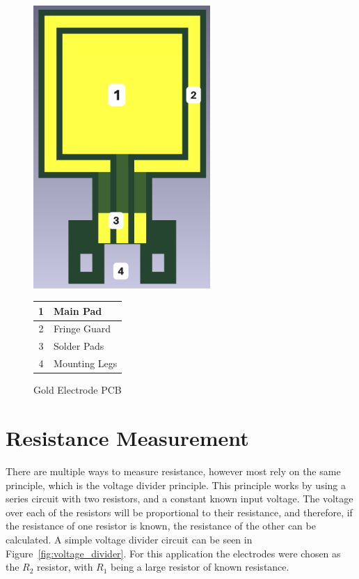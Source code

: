 \begin{figure}[H]
    \begin{minipage}{0.5\textwidth}
        \centering
        \includegraphics[width=0.6\textwidth]{Figures/electrode_pcb.png}
    \end{minipage}
    \begin{minipage}{0.5\textwidth}
        \centering
        \begin{tabular}{cl} \hline
            1 & Main Pad \\ \hline
            2 & Fringe Guard \\ \hline
            3 & Solder Pads \\ \hline
            4 & Mounting Legs \\ \hline
        \end{tabular}
    \end{minipage}
    \caption{Gold Electrode PCB}
    \label{fig:electrode_pcb} %
\end{figure}


\section{Resistance Measurement}\label{sec:res_mes}
There are multiple ways to measure resistance, however most rely on the same principle, which is the voltage divider principle.
This principle works by using a series circuit with two resistors, and a constant known input voltage.
The voltage over each of the resistors will be proportional to their resistance, and therefore, if the resistance of one resistor is known, the resistance of the other can be calculated.
A simple voltage divider circuit can be seen in Figure~\ref{fig:voltage_divider}.
For this application the electrodes were chosen as the $R_2$ resistor, with $R_1$ being a large resistor of known resistance.

